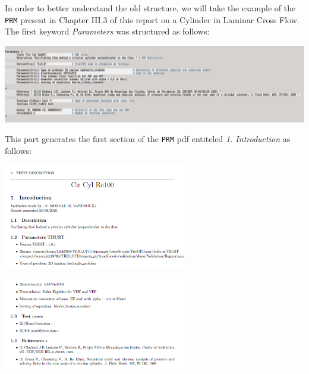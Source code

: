 In order to better understand the old structure, we will take the example of the \texttt{PRM} present in Chapter III.3 of
this report on a Cylinder in Laminar Cross Flow. The first keyword \textit{Parameters} was structured as follows:\newline
\begin{center}\includegraphics[width=16cm]{tools/parameters_PRM_1.png}\end{center}
\begin{center}\end{center}

This part generates the first section of the \texttt{PRM} pdf entiteled \textit{1. Introduction} as follows:\newline
\setlength{\columnseprule}{0.5pt}
\begin{multicols}{2}
\begin{flushleft}\includegraphics[width=8cm]{tools/parameters_PRM_1_pdf.png}\end{flushleft}
\columnbreak
\vspace{0.5cm}\begin{flushright}\includegraphics[width=8cm]{tools/parameters_PRM_2_pdf.png}\end{flushright}
\end{multicols}
\begin{center}\end{center}

